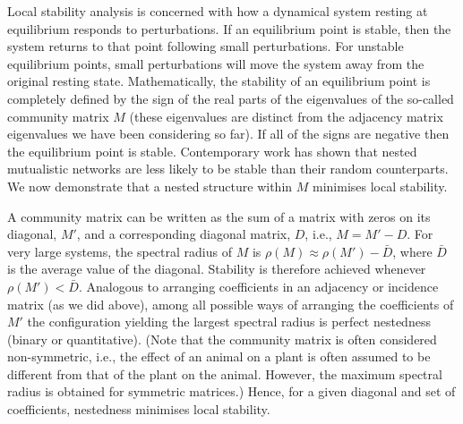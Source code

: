 \documentclass[pdftex]{nature}
\begin{document}
Local stability analysis is concerned with how a dynamical system
resting at equilibrium responds to perturbations.  If an equilibrium
point is stable, then the system returns to that point following small
perturbations.  For unstable equilibrium points, small perturbations
will move the system away from the original resting state.
Mathematically, the stability of an equilibrium point is completely
defined by the sign of the real parts of the eigenvalues of the
so-called community matrix
$M$\cite{levins1968evolution,may2001stability,StabilityCriteria}
(these eigenvalues are distinct from the adjacency matrix eigenvalues
we have been considering so far).  If all of the signs are negative
then the equilibrium point is stable.  Contemporary work has shown
that nested mutualistic networks are less likely to be stable than
their random counterparts\cite{StabilityCriteria}.  We now demonstrate
that a nested structure within $M$ minimises local stability.

A community matrix can be written as the sum of a matrix with zeros on
its diagonal, $M'$, and a corresponding diagonal matrix, $D$, i.e.,
$M=M'-D$.  For very large systems, the spectral radius of $M$ is
$\rho(M) \approx \rho(M') - \bar{D}$, where $\bar{D}$ is the average
value of the diagonal\cite{StabilityCriteria}.  Stability is therefore
achieved whenever $\rho(M') < \bar{D}$.  Analogous to arranging
coefficients in an adjacency or incidence matrix (as we did above),
among all possible ways of arranging the coefficients of $M'$ the
configuration yielding the largest spectral radius is perfect
nestedness (binary or quantitative).  (Note that the community matrix
is often considered non-symmetric, i.e., the effect of an animal on a
plant is often assumed to be different from that of the plant on the
animal.  However, the maximum spectral radius is obtained for
symmetric matrices.)  Hence, for a given diagonal and set of
coefficients, nestedness minimises local stability.
\end{document}
